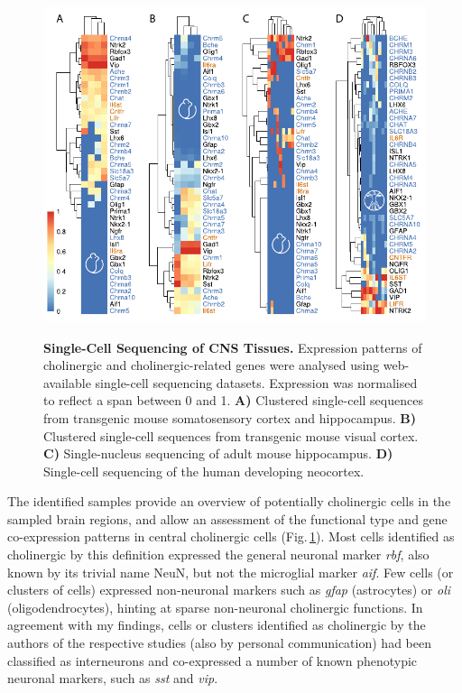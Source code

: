 \begin{figure}[ht]
\centering
\includegraphics[height=10cm]{figures/singlecell}
\caption[Single-Cell Sequencing of CNS Tissues.]{\textbf{Single-Cell Sequencing of CNS Tissues.} Expression patterns of cholinergic and cholinergic-related genes were analysed using web-available single-cell sequencing datasets. Expression was normalised to reflect a span between 0 and 1. \textbf{A)} Clustered single-cell sequences from transgenic mouse somatosensory cortex and hippocampus\cite{Zeisel2015}. \textbf{B)} Clustered single-cell sequences from transgenic mouse visual cortex\cite{Tasic2016}. \textbf{C)} Single-nucleus sequencing of adult mouse hippocampus\cite{Habib2016}. \textbf{D)} Single-cell sequencing of the human developing neocortex\cite{Darmanis2015}. 
\label{fig:singlecell}}
\end{figure}

The identified samples provide an overview of potentially cholinergic cells in the sampled brain regions, and allow an assessment of the functional type and gene co-expression patterns in central cholinergic cells (Fig.\,\ref{fig:singlecell}). Most cells identified as cholinergic by this definition expressed the general neuronal marker \textit{\acs{rbf}}, also known by its trivial name NeuN, but not the microglial marker \textit{\acs{aif}}. Few cells (or clusters of cells) expressed non-neuronal markers such as \textit{\acs{gfap}} (astrocytes) or \textit{\acs{oli}} (oligodendrocytes), hinting at sparse non-neuronal cholinergic functions. In agreement with my findings, cells or clusters identified as cholinergic by the authors of the respective studies\cite{Zeisel2015, Tasic2016} (also by personal communication) had been classified as interneurons and co-expressed a number of known phenotypic neuronal markers, such as \textit{\ac{sst}} and \textit{\ac{vip}}.

